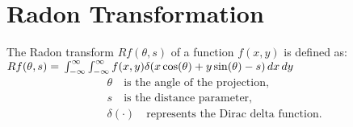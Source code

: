 \section{Radon Transformation}
The Radon transform $Rf(\theta, s)$ of a function $f(x, y)$ is defined as:\\
$
Rf(\theta, s) =\\
\int_{-\infty}^{\infty} \int_{-\infty}^{\infty} f(x, y) \delta(x\cos(\theta) + y\sin(\theta) - s) \,dx\,dy$
\begin{align*}
& \theta \quad \text{is the angle of the projection,} \\
& s \quad \text{is the distance parameter,} \\
& \delta(\cdot) \quad \text{represents the Dirac delta function.}
\end{align*}
